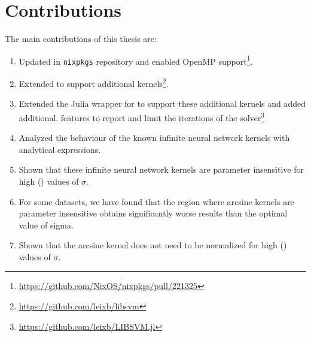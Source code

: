 


\section{Contributions}

The main contributions of this thesis are:
\begin{enumerate}
    \item Updated \libsvm in \texttt{nixpkgs} repository and enabled OpenMP support\footnote{\url{https://github.com/NixOS/nixpkgs/pull/221325}}.
    \item Extended \libsvm to support additional kernels\footnote{\url{https://github.com/leixb/libsvm}}.
    \item Extended the Julia wrapper for \libsvm to support these additional kernels and added additional.
          features to report and limit the iterations of the solver\footnote{\url{https://github.com/leixb/LIBSVM.jl}}
    \item Analyzed the behaviour of the known infinite neural network kernels with analytical expressions.
    \item Shown that these infinite neural network kernels are parameter insensitive for high (\threshold) values of $\sigma$.
    \item For some datasets, we have found that the region where arcsine kernels are parameter insensitive obtains
          significantly worse results than the optimal value of sigma.
    \item Shown that the arcsine kernel does not need to be normalized for high (\threshold) values of $\sigma$.
\end{enumerate}
